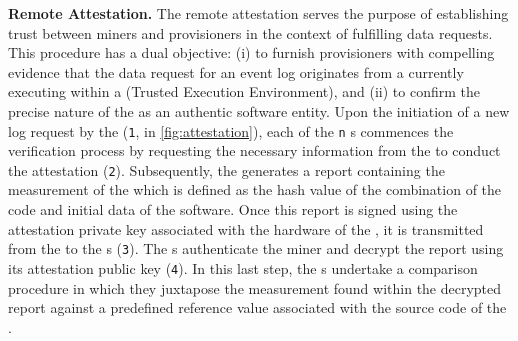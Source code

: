 \textbf{Remote Attestation.} The remote attestation serves the purpose of establishing trust between miners and provisioners in the context of fulfilling data requests. This procedure has a dual objective: (i) to furnish provisioners with compelling evidence that the data request for an event log originates from a  currently executing within a  (Trusted Execution Environment), and (ii) to confirm the precise nature of the  as an authentic  software entity. Upon the initiation of a new log request by the  (\texttt{1}, in \cref{fig:attestation}), each of the \texttt{n} s commences the verification process by requesting the necessary information from the  to conduct the attestation (\texttt{2}). Subsequently, the  generates a report containing the measurement of the  which is defined as the hash value of the combination of the code and initial data of the software. Once this report is signed using the attestation private key associated with the hardware of the , it is transmitted from the  to the s (\texttt{3}). The s authenticate the miner and decrypt the report using its attestation public key (\texttt{4}). In this last step, the s undertake a comparison procedure in which they juxtapose the measurement found within the decrypted report against a predefined reference value associated with the source code of the .

